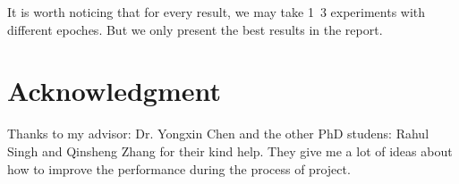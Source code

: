 \documentclass[conference,compsoc]{IEEEtran}
\begin{document}
It is worth noticing that for every result, we may take 1~3 experiments with different epoches. But we only present the best results in the report. 



\section*{Acknowledgment}

Thanks to my advisor: Dr. Yongxin Chen and the other PhD studens: Rahul Singh and Qinsheng Zhang for their kind help. They give me a lot of ideas about how to improve the performance during the process of project.



\end{document}
